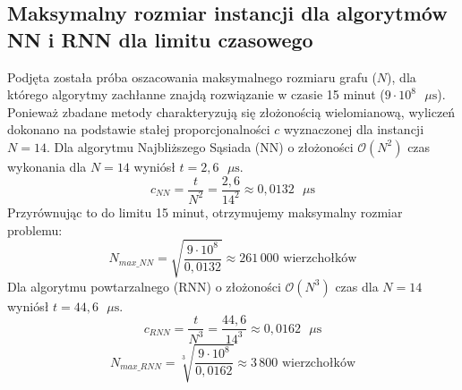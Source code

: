 \documentclass[conference]{IEEEtran}
\begin{document}
        \subsection{Maksymalny rozmiar instancji dla algorytmów NN i RNN dla limitu czasowego}
            Podjęta została próba oszacowania maksymalnego rozmiaru grafu ($N$), dla którego algorytmy zachłanne znajdą rozwiązanie w czasie 15 minut ($9 \cdot 10^8 \text{ }\mu\text{s}$). Ponieważ zbadane metody charakteryzują się złożonością wielomianową, wyliczeń dokonano na podstawie stałej proporcjonalności $c$ wyznaczonej dla instancji $N=14$.
            Dla algorytmu Najbliższego Sąsiada (NN) o złożoności $\mathcal{O}(N^2)$ czas wykonania dla $N=14$ wyniósł $t = 2{,}6 \text{ }\mu\text{s}$.
            \begin{equation}
                c_{NN} = \frac{t}{N^2} = \frac{2{,}6}{14^2} \approx 0{,}0132 \text{ }\mu\text{s}
            \end{equation}
            Przyrównując to do limitu 15 minut, otrzymujemy maksymalny rozmiar problemu:
            \begin{equation}
                N_{max\_NN} = \sqrt{\frac{9 \cdot 10^8}{0{,}0132}} \approx 261\,000 \text{ wierzchołków}
            \end{equation}
            Dla algorytmu powtarzalnego (RNN) o złożoności $\mathcal{O}(N^3)$ czas dla $N=14$ wyniósł $t = 44{,}6 \text{ }\mu\text{s}$.
            \begin{equation}
                c_{RNN} = \frac{t}{N^3} = \frac{44{,}6}{14^3} \approx 0{,}0162 \text{ }\mu\text{s}
            \end{equation}
            \begin{equation}
                N_{max\_RNN} = \sqrt[3]{\frac{9 \cdot 10^8}{0{,}0162}} \approx 3\,800 \text{ wierzchołków}
            \end{equation}
\end{document}
